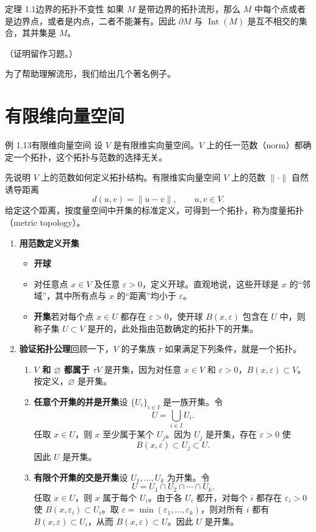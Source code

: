 \begin{statement}{定理 1.1}{边界的拓扑不变性}
如果 $M$ 是带边界的拓扑流形，那么 $M$ 中每个点或者是边界点，或者是内点，二者不能兼有。因此 $\partial M$ 与 $\operatorname{Int}(M)$ 是互不相交的集合，其并集是 $M$。

（证明留作习题。）
\end{statement}

为了帮助理解流形，我们给出几个著名例子。

\section{有限维向量空间}
\begin{statement}{例 1.13}{有限维向量空间}
设 $V$ 是有限维实向量空间。$V$ 上的任一范数（norm）都确定一个拓扑，这个拓扑与范数的选择无关。

先说明 $V$ 上的范数如何定义拓扑结构。有限维实向量空间 $V$ 上的范数 $\lVert\cdot\rVert$ 自然诱导距离
\[
  d(u,v)=\lVert u-v\rVert,
  \qquad u,v\in V.
\]
给定这个距离，按度量空间中开集的标准定义，可得到一个拓扑，称为度量拓扑（metric topology）。

\begin{enumerate}[label=\alph*.]
  \item \textbf{用范数定义开集}
  \begin{itemize}
    \item \textbf{开球}
    \item 对任意点 $x\in V$ 及任意 $\varepsilon>0$，定义开球。直观地说，这些开球是 $x$ 的“邻域”，其中所有点与 $x$ 的“距离”均小于 $\varepsilon$。
    \item \textbf{开集}\quad 若对每个点 $x\in U$ 都存在 $\varepsilon>0$，使开球 $B(x,\varepsilon)$ 包含在 $U$ 中，则称子集 $U\subset V$ 是开的，此处指由范数确定的拓扑下的开集。
  \end{itemize}
  \item \textbf{验证拓扑公理}\quad 回顾一下，$V$ 的子集族 $\tau$ 如果满足下列条件，就是一个拓扑。
  \begin{enumerate}[label=\arabic*.]
    \item \textbf{$V$ 和 $\varnothing$ 都属于 $\tau$}\quad $V$ 是开集，因为对任意 $x\in V$ 和 $\varepsilon>0$，$B(x,\varepsilon)\subset V$。按定义，$\varnothing$ 是开集。
    \item \textbf{任意个开集的并是开集}\quad 设 $\{U_i\}_{i\in I}$ 是一族开集。令
    \[
      U=\bigcup_{i\in I}U_i.
    \]
    任取 $x\in U$，则 $x$ 至少属于某个 $U_j$。因为 $U_j$ 是开集，存在 $\varepsilon>0$ 使
    \[
      B(x,\varepsilon)\subset U_j\subset U.
    \]
    因此 $U$ 是开集。
    \item \textbf{有限个开集的交是开集}\quad 设 $U_1,\ldots,U_k$ 为开集。令
    \[
      U=U_1\cap U_2\cap\cdots\cap U_k.
    \]
    任取 $x\in U$，则 $x$ 属于每个 $U_i$。由于各 $U_i$ 都开，对每个 $i$ 都存在 $\varepsilon_i>0$ 使 $B(x,\varepsilon_i)\subset U_i$。取 $\varepsilon=\min(\varepsilon_1,\ldots,\varepsilon_k)$，则对所有 $i$ 都有 $B(x,\varepsilon)\subset U_i$，从而 $B(x,\varepsilon)\subset U$。因此 $U$ 是开集。
  \end{enumerate}
\end{enumerate}


\end{statement}
